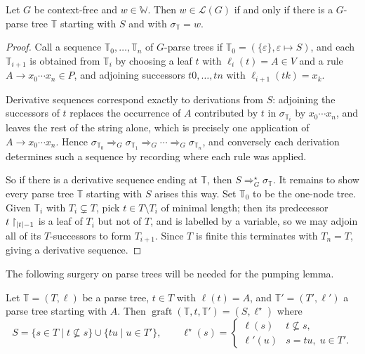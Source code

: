 \documentclass[a4paper]{scrartcl}
\newcommand{\WW}{\mathbb{W}}
\newcommand{\graft}{\operatorname{graft}}
\newcommand{\lang}{\mathcal{L}}
\newcommand{\eps}{\varepsilon}
\begin{document}
\begin{proposition}\label{prop:parsetreeiff}
	Let $G$ be context-free and $w \in \WW$. Then $w \in \lang(G)$ if and only if there is a $G$-parse tree $\mathbb T$ starting with $S$ and with $\sigma_{\mathbb T} = w$.
\end{proposition}

\begin{proof}
	Call a sequence $\mathbb T_0, \dots, \mathbb T_n$ of $G$-parse trees  if $\mathbb T_0 = (\{\eps\}, \eps \mapsto S)$, and each $\mathbb T_{i+1}$ is obtained from $\mathbb T_i$ by choosing a leaf $t$ with $\ell_i(t) = A \in V$ and a rule $A \to x_0\cdots x_n \in P$, and adjoining successors $t0, \dots, tn$ with $\ell_{i+1}(tk) = x_k$.

	Derivative sequences correspond exactly to derivations from $S$: adjoining the successors of $t$ replaces the occurrence of $A$ contributed by $t$ in $\sigma_{\mathbb T_i}$ by $x_0\cdots x_n$, and leaves the rest of the string alone, which is precisely one application of $A \to x_0\cdots x_n$. Hence $\sigma_{\mathbb T_0} \Rightarrow_G \sigma_{\mathbb T_1} \Rightarrow_G \cdots \Rightarrow_G \sigma_{\mathbb T_n}$, and conversely each derivation determines such a sequence by recording where each rule was applied.

	So if there is a derivative sequence ending at $\mathbb T$, then $S \Rightarrow_G^\star \sigma_{\mathbb T}$. It remains to show every parse tree $\mathbb T$ starting with $S$ arises this way. Set $\mathbb T_0$ to be the one-node tree. Given $\mathbb T_i$ with $T_i \subsetneq T$, pick $t \in T \setminus T_i$ of minimal length; then its predecessor $t\restriction_{\lvert t\rvert-1}$ is a leaf of $T_i$ but not of $T$, and is labelled by a variable, so we may adjoin all of its $T$-successors to form $T_{i+1}$. Since $T$ is finite this terminates with $T_n = T$, giving a derivative sequence.
\end{proof}

The following surgery on parse trees will be needed for the pumping lemma.

\begin{definition}[Grafting]
	Let $\mathbb T = (T,\ell)$ be a parse tree, $t \in T$ with $\ell(t) = A$, and $\mathbb T' = (T', \ell')$ a parse tree starting with $A$. Then $\graft(\mathbb T, t, \mathbb T') = (S,\ell^\star)$ where
	$$S = \{s \in T \mid t \not\subseteq s\} \cup \{tu \mid u \in T'\}, \qquad \ell^\star(s) = \begin{cases}\ell(s) & t \not\subseteq s,\\ \ell'(u) & s = tu,\; u \in T'.\end{cases}$$
\end{definition}
\end{document}
